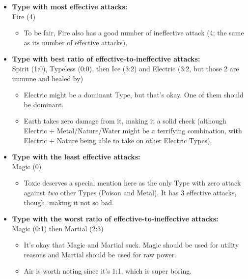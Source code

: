 \begin{itemize}
	\item{\textbf{Type with most effective attacks:}\\Fire (4)
		\begin{itemize}
			\item{To be fair, Fire also has a good number of ineffective attack (4; the same as its number of effective attacks).}
		\end{itemize}
	}
	\item{\textbf{Type with best ratio of effective-to-ineffective attacks:}\\Spirit (1:0), Typeless (0:0), then Ice (3:2) and Electric (3:2, but those 2 are immune and healed by)
		\begin{itemize}
			\item{Electric might be a dominant Type, but that's okay. One of them should be dominant.}
			\item{Earth takes zero damage from it, making it a solid check (although Electric + Metal/Nature/Water might be a terrifying combination, with Electric + Nature being able to take on other Electric Types).}
		\end{itemize}
	}
	\item{\textbf{Type with the least effective attacks:}\\Magic (0)
		\begin{itemize}
			\item{Toxic deserves a special mention here as the only Type with zero attack against \textit{two} other Types (Poison and Metal). It has 3 effective attacks, though, making it not so bad.}
		\end{itemize}
	}
	\item{\textbf{Type with the worst ratio of effective-to-ineffective attacks:}\\Magic (0:1) then Martial (2:3)
		\begin{itemize}
			\item{It's okay that Magic and Martial suck. Magic should be used for utility reasons and Martial should be used for raw power.}
			\item{Air is worth noting since it's 1:1, which is super boring.}
		\end{itemize}
	}
\end{itemize}

